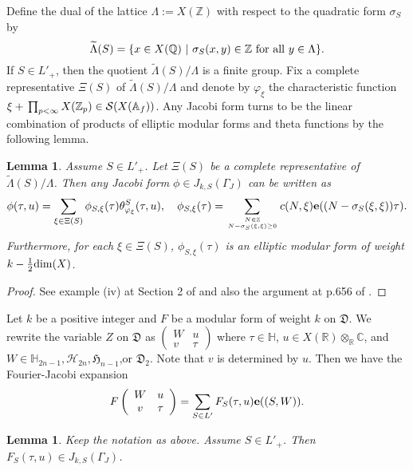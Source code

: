 \documentclass[11pt]{amsart}
\numberwithin{equation}{section}
\newtheorem{lemma}[theorem]{Lemma}
\theoremstyle{definition}
\begin{document}
Define the dual of the lattice $\Lambda:=X({\mathbb{Z}})$ with respect to the quadratic form $\sigma_S$ by
$$\widetilde{\Lambda}(S)=\{x\in X({\mathbb{Q}})\ |\ \sigma_S(x,y)\in {\mathbb{Z}} {\rm \ for\ all}\ y\in \Lambda \}.$$
If $S\in L'_{+}$, then the quotient $\widetilde{\Lambda}(S)/\Lambda$ is a finite group.
Fix a complete representative $\Xi(S)$ of $\widetilde{\Lambda}(S)/\Lambda$ and denote by
$\varphi_\xi$ the characteristic function $\xi+{\displaystyle}\prod_{p<\infty}X({\mathbb{Z}}_p)\in \mathcal{S}(X({\mathbb{A}}_f))$.
Any Jacobi form turns to be the linear combination of products of elliptic modular forms and
theta functions by the following lemma.
\begin{lemma}\label{product} Assume $S\in L'_{+}$.
Let $\Xi(S)$ be a complete representative of $\widetilde{\Lambda}(S)/\Lambda$. Then
any Jacobi form $\phi\in J_{k,S}(\Gamma_J)$ can be written as
$$\phi(\tau,u)=\sum_{\xi\in \Xi(S)}\phi_{S,\xi}(\tau) \theta^S_{\varphi_\xi}(\tau,u),\quad
\phi_{S,\xi}(\tau)=\sum_{N\in {\mathbb{Z}} \atop N-\sigma_S(\xi,\xi)\ge 0}c(N,\xi)\bold{e}((N-\sigma_S(\xi,\xi))\tau).
$$
Furthermore, for each $\xi\in \Xi(S)$,  $\phi_{S,\xi}(\tau)$ is an elliptic modular form of weight $k-\frac{1}{2}{\rm dim}(X)$.
\end{lemma}
\begin{proof} See example (iv) at Section 2 of \cite{Krieg} and also the argument at p.656 of \cite{Ik1}.
\end{proof}
Let $k$ be a positive integer and $F$ be a modular form of weight $k$ on $\mathfrak{D}$.
We rewrite the variable $Z$ on ${\mathfrak{D}}$ as
$\left(\begin{array}{cc}
W & u \\
v & \tau
\end{array}\right)$ where $\tau\in\mathbb{H}$, $u\in X({\mathbb{R}})\otimes_{\mathbb{R}}{\mathbb{C}}$, and $W\in \mathbb{H}_{2n-1},\mathcal{H}_{2n},\mathfrak{H}_{n-1}$,or
$\mathfrak{D}_2$. Note that $v$ is determined by $u$.
Then we have the Fourier-Jacobi expansion
\begin{equation}\label{FJ}
F\left(\begin{array}{cc}
W & u \\
v & \tau
\end{array}\right)=\sum_{S\in  L'} F_S(\tau,u)\bold{e}((S,W)).
\end{equation}
\begin{lemma}\label{FJC} Keep the notation as above. Assume $S\in L'_+$.
Then $F_S(\tau,u)\in J_{k,S}(\Gamma_J)$.
\end{lemma}
\end{document}

